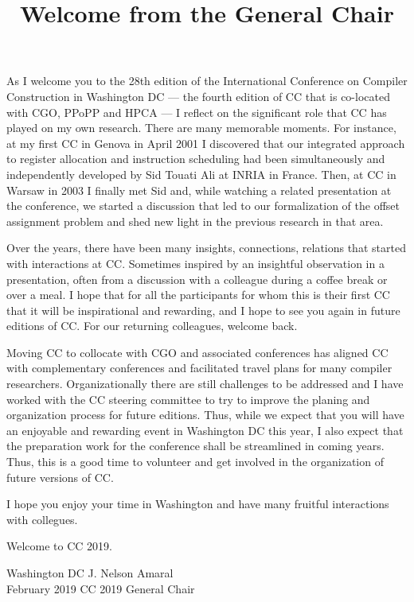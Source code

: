 \documentclass[12pt,letterpaper]{article}
\begin{document}
\title{\sffamily\bfseries Welcome from the General Chair}
\date{}

\maketitle
\thispagestyle{empty}
\pagestyle{empty}

As I welcome you to the 28th edition of the International Conference on Compiler Construction in Washington DC --- the fourth edition of CC that is co-located with CGO, PPoPP and HPCA --- I reflect on the significant role that CC has played on my own research. There are many memorable moments. For instance, at my first CC in Genova in April 2001 I discovered that our integrated approach to register allocation and instruction scheduling had been simultaneously and independently developed by Sid Touati Ali at INRIA in France. Then, at CC in Warsaw in 2003 I finally met Sid and, while watching a related presentation at the conference, we started a discussion that led to our formalization of the offset assignment problem and shed new light in the previous research in that area.  

Over the years, there have been many insights, connections, relations that started with interactions at CC. Sometimes inspired by an insightful observation in a presentation, often from a discussion with a colleague during a coffee break or over a meal. I hope that for all the participants for whom this is their first CC that it will be inspirational and rewarding, and I hope to see you again in future editions of CC. For our returning colleagues, welcome back. 

Moving CC to collocate with CGO and associated conferences has aligned CC with complementary conferences and facilitated travel plans for many compiler researchers. Organizationally there are still challenges to be addressed and I have worked with the CC steering committee to try to improve the planing and organization process for future editions. Thus, while we expect that you will have an enjoyable and rewarding event in Washington DC this year, I also expect that the preparation work for the conference shall be streamlined in coming years. Thus, this is a good time to volunteer and get involved in the organization of future versions of CC.

I hope you enjoy your time in Washington and have many fruitful interactions with collegues.

Welcome to CC 2019.

\bigskip
\noindent
Washington DC \hfill J. Nelson Amaral\\
February 2019 \hfill CC 2019 General Chair
\end{document}
